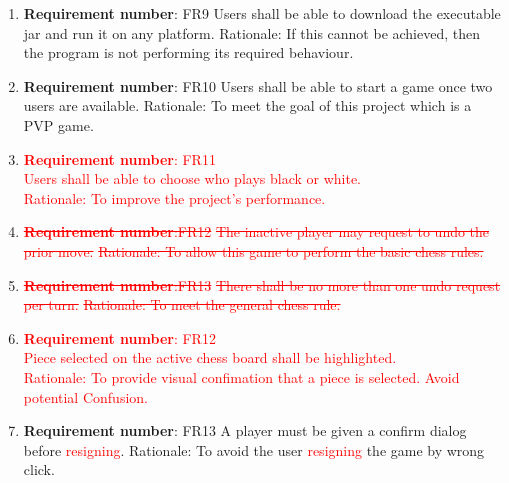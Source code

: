 \documentclass[12pt, titlepage]{article}
\begin{document}
\begin{enumerate}
\item \textbf{Requirement number}: FR9\newline
Users shall be able to download the executable jar and run it on any platform.\newline
Rationale: If this cannot be achieved, then the program is not performing its required behaviour.
\item \textbf{Requirement number}: FR10\newline
Users shall be able to start a game once two users are available. \newline
Rationale: To meet the goal of this project which is a PVP game.

\item
\textcolor{red}{
\textbf{Requirement number}: FR11\\
Users shall be able to choose who plays black or white. \\
Rationale: To improve the project’s performance.}

\item 
\textcolor{red}{
\sout{\textbf{Requirement number}:FR12}\newline
\sout{The inactive player may request to undo the prior move.} \newline
\sout{Rationale: To allow this game to perform the basic chess rules.}}
\item 
\textcolor{red}{
\sout{\textbf{Requirement number}:FR13}\newline
\sout{There shall be no more than one undo request per turn.}\newline
\sout{Rationale: To meet the general chess rule.}}
\item 
\textcolor{red}{
\textbf{Requirement number}: FR12\\
Piece selected on the active chess board shall be highlighted.\\
Rationale: To provide visual confimation that a piece is selected. Avoid potential Confusion.}

\item \textbf{Requirement number}: FR13\newline
A player must be given a confirm dialog before \textcolor{red}{ resigning}. \newline
Rationale: To avoid the user \textcolor{red}{resigning} the game by wrong click.
 

\end{enumerate}
\end{document}
